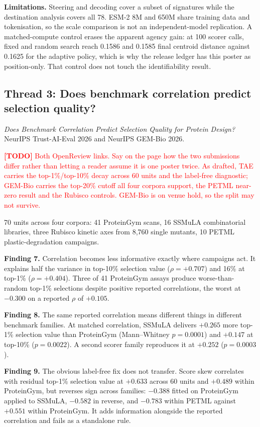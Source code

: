 \documentclass[11pt]{article}
\newcommand{\todo}[1]{\par\medskip\noindent\textcolor{red}{\textbf{[TODO]} #1}\par\medskip}
\newcommand{\finding}[2]{\par\medskip\noindent\textbf{Finding #1.} #2\par\medskip}
\begin{document}
\textbf{Limitations.} Steering and decoding cover a subset of signatures while the destination analysis covers
all 78. ESM-2 8M and 650M share training data and tokenisation, so the scale comparison is not an
independent-model replication. A matched-compute control erases the apparent agency gain: at 100 scorer calls,
fixed and random search reach 0.1586 and 0.1585 final centroid distance against 0.1625 for the adaptive policy,
which is why the release ledger has this poster as position-only. That control does not touch the
identifiability result.

\subsection*{Thread 3: Does benchmark correlation predict selection quality?}

\emph{Does Benchmark Correlation Predict Selection Quality for Protein Design?}
NeurIPS Trust-AI-Eval 2026 and NeurIPS GEM-Bio 2026. \todo{Both OpenReview links. Say on the page how the two
submissions differ rather than letting a reader assume it is one poster twice. As drafted, TAE carries the
top-1\%/top-10\% decay across 60 units and the label-free diagnostic; GEM-Bio carries the top-20\% cutoff all
four corpora support, the PETML near-zero result and the Rubisco controls. GEM-Bio is on venue hold, so the
split may not survive.}

70 units across four corpora: 41 ProteinGym scans, 16 SSMuLA combinatorial libraries, three Rubisco kinetic
axes from 8{,}760 single mutants, 10 PETML plastic-degradation campaigns.

\finding{7}{Correlation becomes less informative exactly where campaigns act. It explains half the variance in
top-10\% selection value ($\rho = +0.707$) and 16\% at top-1\% ($\rho = +0.404$). Three of 41 ProteinGym
assays produce worse-than-random top-1\% selections despite positive reported correlations, the worst at
$-0.300$ on a reported $\rho$ of $+0.105$.}

\finding{8}{The same reported correlation means different things in different benchmark families. At matched
correlation, SSMuLA delivers $+0.265$ more top-1\% selection value than ProteinGym (Mann--Whitney
$p = 0.0001$) and $+0.147$ at top-10\% ($p = 0.0022$). A second scorer family reproduces it at $+0.252$
($p = 0.0003$).}

\finding{9}{The obvious label-free fix does not transfer. Score skew correlates with residual top-1\%
selection value at $+0.633$ across 60 units and $+0.489$ within ProteinGym, but reverses sign across families:
$-0.388$ fitted on ProteinGym applied to SSMuLA, $-0.582$ in reverse, and $-0.783$ within PETML against
$+0.551$ within ProteinGym. It adds information alongside the reported correlation and fails as a standalone
rule.}
\end{document}
